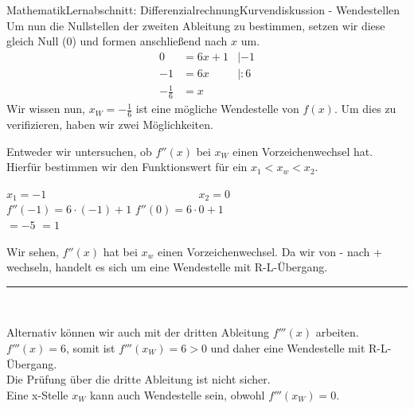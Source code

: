 \documentclass[11pt,twocolumn,oneside,openany,headings=optiontotoc,11pt,numbers=noenddot]{article}
\begin{document}
\begin{worksheet}{Mathematik}{Lernabschnitt: Differenzialrechnung}{Kurvendiskussion - Wendestellen}
		Um nun die Nullstellen der zweiten Ableitung zu bestimmen, setzen wir diese gleich Null (0) und formen anschließend nach \(x\) um.
		\begin{align*}
			0 & = 6x +1 & |-1\\
			-1 & = 6x & |:6\\
			-\frac{1}{6} & = x
		\end{align*}
		Wir wissen nun, \(x_W = -\frac{1}{6}\) ist eine mögliche Wendestelle von \(f(x)\). Um dies zu verifizieren, haben wir zwei Möglichkeiten.\\
		\par\noindent
		Entweder wir untersuchen, ob \(f''(x)\) bei \(x_W\) einen Vorzeichenwechsel hat. Hierfür bestimmen wir den Funktionswert für ein \(x_1 < x_w < x_2\).
		\begin{tabbing}
			\(x_1 = -1\) ~~~~~~~~~~~~~~~~~~~~~~~~~~ \= \(x_2 = 0\)\\
			\(f''(-1) = 6\cdot(-1) + 1\) \> \(f''(0) = 6\cdot{}0 + 1\)\\
			\( = -5\) \> \(= 1\)
		\end{tabbing}
		Wir sehen, \(f''(x)\) hat bei \(x_w\) einen Vorzeichenwechsel. Da wir von \glqq{}-\grqq{} nach \glqq{}+\grqq{} wechseln, handelt es sich um eine Wendestelle mit R-L-Übergang.\\
		\rule{0.48\textwidth}{0.1pt}\\
		\par\noindent
		Alternativ können wir auch mit der dritten Ableitung \(f'''(x)\) arbeiten.\\
		\(f'''(x) = 6\), somit ist \(f'''(x_W) = 6 > 0\) und daher eine Wendestelle mit R-L-Übergang.\\
		\normalcolor{} Die Prüfung über die dritte Ableitung ist nicht sicher.\\
		Eine x-Stelle \(x_W\) kann auch Wendestelle sein, obwohl \(f'''(x_W) = 0\).
		\newpage

\end{worksheet}
\end{document}

